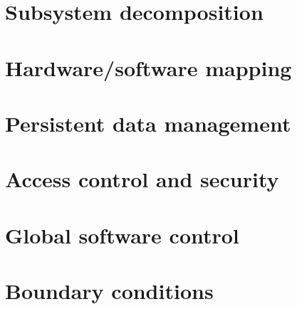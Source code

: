 \documentclass[a4paper,12pt]{article}
\begin{document}
 \section{Subsystem decomposition}



 \section{Hardware/software mapping}

 \section{Persistent data management} %



 \section{Access control and security} %


 \section{Global software control} %



 \section{Boundary conditions} %


 
\end{document}
